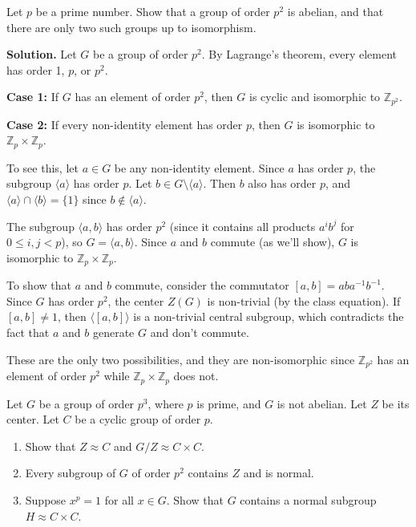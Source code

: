 \begin{problembox}
Let $p$ be a prime number. Show that a group of order $p^2$ is abelian, and that there are only two such groups up to isomorphism.
\end{problembox}

\noindent\textbf{Solution.} Let $G$ be a group of order $p^2$. By Lagrange's theorem, every element has order 1, $p$, or $p^2$.

\textbf{Case 1:} If $G$ has an element of order $p^2$, then $G$ is cyclic and isomorphic to $\mathbb{Z}_{p^2}$.

\textbf{Case 2:} If every non-identity element has order $p$, then $G$ is isomorphic to $\mathbb{Z}_p \times \mathbb{Z}_p$.

To see this, let $a \in G$ be any non-identity element. Since $a$ has order $p$, the subgroup $\langle a \rangle$ has order $p$. Let $b \in G \setminus \langle a \rangle$. Then $b$ also has order $p$, and $\langle a \rangle \cap \langle b \rangle = \{1\}$ since $b \notin \langle a \rangle$.

The subgroup $\langle a, b \rangle$ has order $p^2$ (since it contains all products $a^ib^j$ for $0 \leq i, j < p$), so $G = \langle a, b \rangle$. Since $a$ and $b$ commute (as we'll show), $G$ is isomorphic to $\mathbb{Z}_p \times \mathbb{Z}_p$.

To show that $a$ and $b$ commute, consider the commutator $[a,b] = aba^{-1}b^{-1}$. Since $G$ has order $p^2$, the center $Z(G)$ is non-trivial (by the class equation). If $[a,b] \neq 1$, then $\langle [a,b] \rangle$ is a non-trivial central subgroup, which contradicts the fact that $a$ and $b$ generate $G$ and don't commute.

These are the only two possibilities, and they are non-isomorphic since $\mathbb{Z}_{p^2}$ has an element of order $p^2$ while $\mathbb{Z}_p \times \mathbb{Z}_p$ does not.

\begin{problembox}
Let $G$ be a group of order $p^3$, where $p$ is prime, and $G$ is not abelian. Let $Z$ be its center. Let $C$ be a cyclic group of order $p$.
\begin{enumerate}[label=(\alph*)]
\item Show that $Z \approx C$ and $G/Z \approx C \times C$.
\item Every subgroup of $G$ of order $p^2$ contains $Z$ and is normal.
\item Suppose $x^p = 1$ for all $x \in G$. Show that $G$ contains a normal subgroup $H \approx C \times C$.
\end{enumerate}
\end{problembox}


